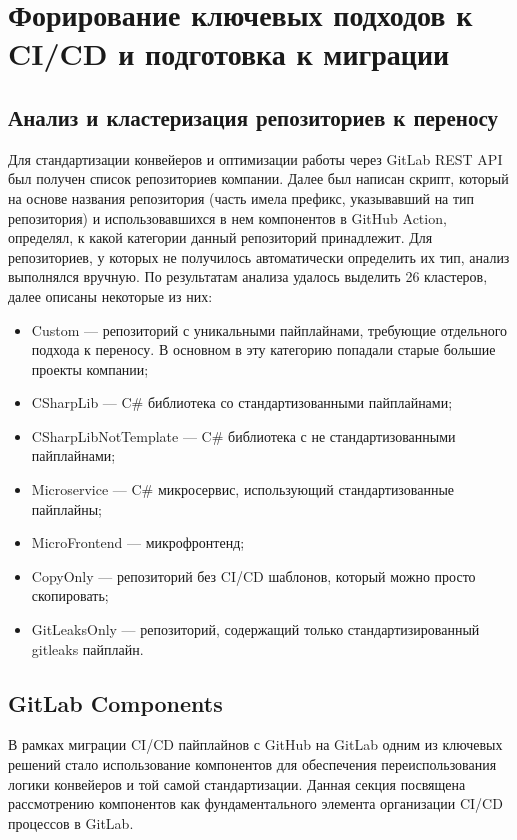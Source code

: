 \chapter{Форирование ключевых подходов к CI/CD и подготовка к миграции} \label{ch:ch2}

\section{Анализ и кластеризация репозиториев к переносу} \label{sec:repository-analysis}
Для стандартизации конвейеров и оптимизации работы через GitLab REST API\cite{gl-rest-api} был получен список репозиториев компании.
Далее был написан скрипт,
который на основе названия репозитория (часть имела префикс, указывавший на тип репозитория) и использовавшихся в нем компонентов в GitHub Action,
определял, к какой категории данный репозиторий принадлежит.
Для репозиториев, у которых не получилось автоматически определить их тип, анализ выполнялся вручную.
По результатам анализа удалось выделить 26 кластеров, далее описаны некоторые из них:
\begin{itemize}
  \item Custom — репозиторий с уникальными пайплайнами, требующие отдельного подхода к переносу.
        В основном в эту категорию попадали старые большие проекты компании;
  \item CSharpLib — C\# библиотека со стандартизованными пайплайнами;
  \item CSharpLibNotTemplate — C\# библиотека с не стандартизованными пайплайнами;
  \item Microservice — C\# микросервис, использующий стандартизованные пайплайны;
  \item MicroFrontend — микрофронтенд;
  \item CopyOnly — репозиторий без CI/CD шаблонов, который можно просто скопировать;
  \item GitLeaksOnly — репозиторий, содержащий только стандартизированный gitleaks пайплайн.
\end{itemize}

\section{GitLab Components} \label{sec:gl-components}
В рамках миграции CI/CD пайплайнов с GitHub на GitLab одним из ключевых решений стало использование компонентов
для обеспечения переиспользования логики конвейеров и той самой стандартизации.
Данная секция посвящена рассмотрению компонентов как фундаментального элемента организации CI/CD процессов в GitLab.

